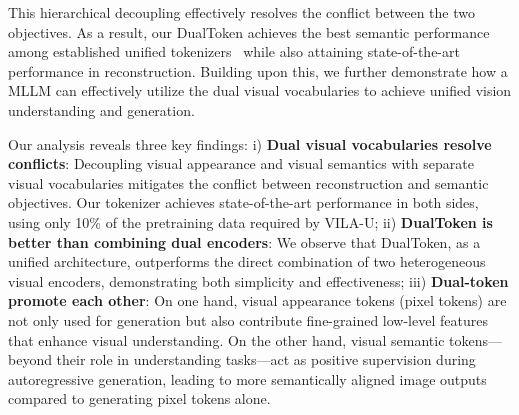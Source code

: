 This hierarchical decoupling effectively resolves the conflict between the two objectives. 
As a result, our DualToken achieves the best semantic performance among established unified tokenizers~\citep{wu2025vilau,zhao2025qlip,qu2024tokenflow,unitok} while also attaining state-of-the-art performance in reconstruction.
Building upon this, we further demonstrate how a MLLM can effectively utilize the dual visual vocabularies to achieve unified vision understanding and generation.

Our analysis reveals three key findings:
i) \textbf{Dual visual vocabularies resolve conflicts}: Decoupling visual appearance and visual semantics with separate visual vocabularies mitigates the conflict between reconstruction and semantic objectives.
Our tokenizer achieves state-of-the-art performance in both sides, using only 10\% of the pretraining data required by VILA-U;
ii) \textbf{DualToken is better than combining dual encoders}: We observe that DualToken, as a unified architecture, outperforms the direct combination of two heterogeneous visual encoders, demonstrating both simplicity and effectiveness;
iii) \textbf{Dual-token promote each other}: On one hand, visual appearance tokens (pixel tokens) are not only used for generation but also contribute fine-grained low-level features that enhance visual understanding. On the other hand, visual semantic tokens---beyond their role in understanding tasks---act as positive supervision during autoregressive generation, leading to more semantically aligned image outputs compared to generating pixel tokens alone.